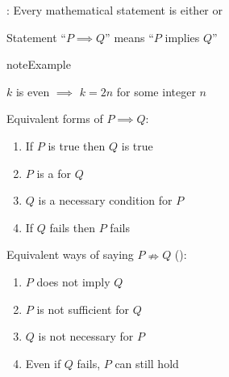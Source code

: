 \documentclass[letterpaper,10pt,english]{jupyterBook}
\begin{document}
\sphinxAtStartPar
{}: Every mathematical statement is either  or 

\sphinxAtStartPar
Statement “\(P \implies Q\)” means “\(P\) implies \(Q\)”

\begin{sphinxadmonition}{note}{Example}

\sphinxAtStartPar
\(k\) is even \(\implies\) \(k = 2n\) for some integer \(n\)
\end{sphinxadmonition}

\sphinxAtStartPar
Equivalent forms of \(P \implies Q\):
\begin{enumerate}
%
\item {} 
\sphinxAtStartPar
If \(P\) is true then \(Q\) is true

\item {} 
\sphinxAtStartPar
\(P\) is a  for \(Q\)

\item {} 
\sphinxAtStartPar
\(Q\) is a necessary condition for \(P\)

\item {} 
\sphinxAtStartPar
If \(Q\) fails then \(P\) fails

\end{enumerate}

\begin{figure}[htbp]
\centering

\noindent{}
\end{figure}

\sphinxAtStartPar
Equivalent ways of saying \(P \nRightarrow Q\) ():
\begin{enumerate}
%
\item {} 
\sphinxAtStartPar
\(P\) does not imply \(Q\)

\item {} 
\sphinxAtStartPar
\(P\) is not sufficient for \(Q\)

\item {} 
\sphinxAtStartPar
\(Q\) is not necessary for \(P\)

\item {} 
\sphinxAtStartPar
Even if \(Q\) fails, \(P\) can still hold

\end{enumerate}
\end{document}
